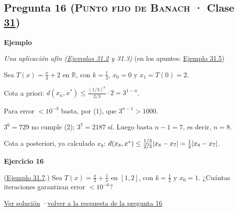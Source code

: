 \documentclass[11pt,a4paper]{article}
\newcommand{\R}{\mathbb{R}}\newcommand{\N}{\mathbb{N}}\newcommand{\Q}{\mathbb{Q}}
\providecommand{\lt}{<}\providecommand{\gt}{>}
\newcommand{\bloque}[1]{\par\smallskip\noindent\textbf{\color{acento}#1}\par}
\begin{document}
\subsection*{\hypertarget{e-16}{}Pregunta 16 \normalfont\small(\textsc{Punto fijo de Banach} · Clase \href{https://decostruttivismo.github.io/MAT2514-repaso/pdf/MAT2514_apuntes_completos.pdf\#nameddest=section.31}{31})}
\bloque{Ejemplo}
\textit{Una aplicación afín (\href{https://decostruttivismo.github.io/MAT2514-repaso/pdf/MAT2514_apuntes_completos.pdf\#nameddest=teorema.31.2}{Ejemplos 31.2} y 31.3)} {\small(en los apuntes: \href{https://decostruttivismo.github.io/MAT2514-repaso/pdf/MAT2514_apuntes_completos.pdf\#nameddest=teorema.31.5}{Ejemplo 31.5})}
\begin{pasos}
\item[] Sea $T(x)=\frac x3+2$ en $\R$, con $k=\frac13$, $x_0=0$ y $x_1=T(0)=2$.
\item[(1)] Cota a priori: $d(x_n,x^*)\le\frac{(1/3)^n}{2/3}\cdot2=3^{1-n}$.
\item[(2)] Para error $\lt 10^{-3}$ basta, por (1), que $3^{n-1}\gt 1000$.
\item[(3)] $3^6=729$ no cumple (2); $3^7=2187$ sí. Luego basta $n-1=7$, es decir, $n=8$.
\item[(4)] Cota a posteriori, ya calculado $x_8$: $d(x_8,x^*)\le\frac{1/3}{2/3}\lvert x_8-x_7\rvert=\frac12\lvert x_8-x_7\rvert$.
\end{pasos}
\bloque{\hypertarget{x-16}{}Ejercicio 16}
(\href{https://decostruttivismo.github.io/MAT2514-repaso/pdf/MAT2514_apuntes_completos.pdf\#nameddest=teorema.31.7}{Ejemplo 31.7}.) Sea $T(x)=\frac x2+\frac1x$ en $[1,2]$, con $k=\frac12$ y $x_0=1$. ¿Cuántas iteraciones garantizan error $\lt 10^{-6}$?
\par{\small \hyperlink{s-16}{Ver solución} \quad·\quad \hyperlink{r-16}{volver a la respuesta de la pregunta 16}}
\end{document}

